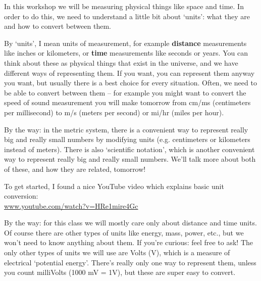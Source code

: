 \documentclass[12pt, letterpaper]{article}
\begin{document}

In this workshop we will be measuring physical things like space and time. 
In order to do this, we need to understand a little bit about `units': what they are and how to convert between them.

By `units', I mean units of measurement, for example \textbf{distance} measurements like inches or kilometers, or \textbf{time} measurements like seconds or years.
You can think about these as physical things that exist in the universe, and we have different ways of representing them.
If you want, you can represent them anyway you want, but usually there is a best choice for every situation.
Often, we need to be able to convert between them -- for example you might want to convert the speed of sound measurement you will make tomorrow from cm/ms (centimeters per millisecond) to m/s (meters per second) or mi/hr (miles per hour).

By the way: in the metric system, there is a convenient way to represent really big and really small numbers by modifying units (e.g. centimeters or kilometers instead of meters).
There is also `scientific notation', which is another convenient way to represent really big and really small numbers.
We'll talk more about both of these, and how they are related, tomorrow!

To get started, I found a nice YouTube video which explains basic unit conversion:\\ \href{https://www.youtube.com/watch?v=HRe1mire4Gc}{www.youtube.com/watch?v=HRe1mire4Gc}


By the way: for this class we will mostly care only about distance and time units.
Of course there are other types of units like energy, mass, power, etc., but we won't need to know anything about them.
If you're curious: feel free to ask!
The only other types of units we will use are Volts (V), which is a measure of electrical `potential energy'.
There's really only one way to represent them, unless you count milliVolts (1000 mV = 1V), but these are super easy to convert.
\end{document}
